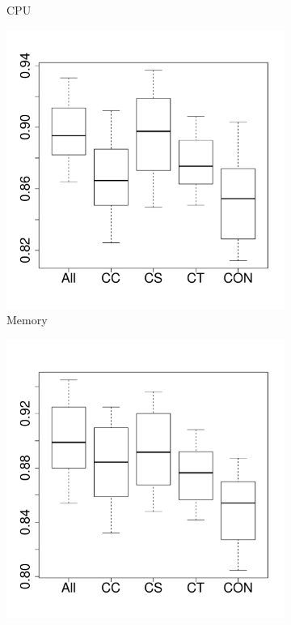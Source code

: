 \documentclass[10pt,journal,compsoc]{IEEEtran}
\begin{document}
\begin{figure}[t]
\begin{subfigure}{0.19\textwidth}
                \caption{CPU}
        \end{subfigure}%
        \begin{subfigure}{0.19\textwidth}
                \includegraphics[width=\linewidth]{Figures/mem-hadoopremove-importance.pdf}
                \caption{Memory}
        \end{subfigure}%
        \begin{subfigure}{0.19\textwidth}
                \includegraphics[width=\linewidth]{Figures/ioread-hadoopremove-importance.pdf}

\end{subfigure}
\end{figure}
\end{document}
